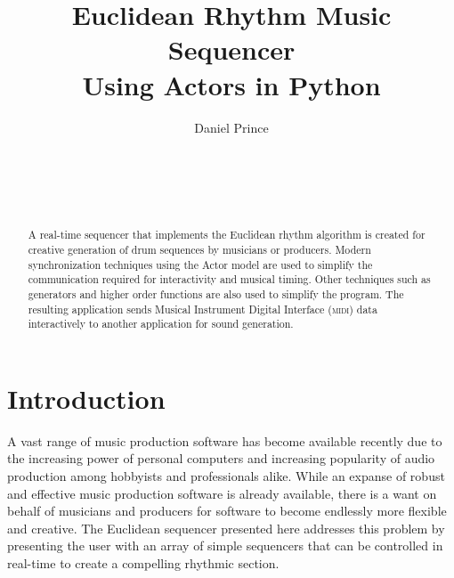 \documentclass{sig-alternate-05-2015}
\begin{document}
\title{Euclidean Rhythm Music Sequencer \\Using Actors in Python}

%
\author{
\alignauthor
Daniel Prince\\
       \\
       \\
       \\
       \\
}

\maketitle
\begin{abstract}
A real-time sequencer that implements the Euclidean rhythm algorithm is created for creative generation of drum sequences by musicians or producers. Modern synchronization techniques using the Actor model are used to simplify the communication required for interactivity and musical timing. Other techniques such as generators and higher order functions are also used to simplify the program. The resulting application sends Musical Instrument Digital Interface (\textsc{midi}) data interactively to another application for sound generation.
\end{abstract}

\section{Introduction}

A vast range of music production software has become available recently due to the increasing power of personal computers and increasing popularity of audio production among hobbyists and professionals alike. While an expanse of robust and effective music production software is already available, there is a want on behalf of musicians and producers for software to become endlessly more flexible and creative. The Euclidean sequencer presented here addresses this problem by presenting the user with an array of simple sequencers that can be controlled in real-time to create a compelling rhythmic section. 
\end{document}
